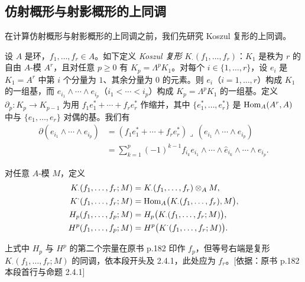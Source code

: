 \begingroup
\setlength{\emergencystretch}{2.5em}
\subsection{仿射概形与射影概形的上同调}
\label{sec:2.4}

在计算仿射概形与射影概形的上同调之前，我们先研究 Koszul 复形的上同调。

设 $A$ 是环，$f_1,\dots,f_r\in A$。如下定义 \emph{Koszul 复形} $K_\cdot(f_1,\dots,f_r)$：$K_1$ 是秩为 $r$ 的自由 $A$-模 $A^r$，且对任意 $p\ge 0$ 有 $K_p=\Lambda^p K_1$。对每个 $i\in\{1,\dots,r\}$，设 $e_i$ 是 $K_1=A^r$ 中第 $i$ 个分量为 $1$、其余分量为 $0$ 的元素。则 $e_i$（$i=1,\dots,r$）构成 $K_1$ 的一组基，而 $e_{i_1}\wedge\cdots\wedge e_{i_p}$（$i_1<\cdots<i_p$）构成 $K_p=\Lambda^p K_1$ 的一组基。定义 $\partial_p\colon K_p\to K_{p-1}$ 为用 $f_1e_1^{*}+\cdots+f_re_r^{*}$ 作缩并，其中 $\{e_1^{*},\dots,e_r^{*}\}$ 是 $\operatorname{Hom}_A(A^r,A)$ 中与 $\{e_1,\dots,e_r\}$ 对偶的基。我们有
\[
\begin{aligned}
\partial(e_{i_1}\wedge\cdots\wedge e_{i_p})
&=(f_1e_1^{*}+\cdots+f_re_r^{*})\lrcorner\,(e_{i_1}\wedge\cdots\wedge e_{i_p})\\
&=\sum_{k=1}^{p}(-1)^{k-1}f_{i_k}e_{i_1}\wedge\cdots\wedge\hat{e}_{i_k}\wedge\cdots\wedge e_{i_p}.
\end{aligned}
\]

对任意 $A$-模 $M$，定义
\[
\begin{aligned}
K_\cdot(f_1,\dots,f_r;M)&=K_\cdot(f_1,\dots,f_r)\otimes_A M,\\
K^{\cdot}(f_1,\dots,f_r;M)&=\operatorname{Hom}_A\bigl(K_\cdot(f_1,\dots,f_r),M\bigr),\\
H_p(f_1,\dots,f_p;M)&=H_p\bigl(K_\cdot(f_1,\dots,f_r;M)\bigr),\\
H^p(f_1,\dots,f_p;M)&=H^p\bigl(K^{\cdot}(f_1,\dots,f_r;M)\bigr).
\end{aligned}
\]

\begin{tnote}
上式中 $H_p$ 与 $H^p$ 的第二个宗量在原书 p.182 印作 $f_p$，但等号右端是复形 $K_\cdot(f_1,\dots,f_r;M)$ 的同调，依本段开头及 2.4.1，此处应为 $f_r$。[依据：原书 p.182 本段首行与命题 2.4.1]
\end{tnote}

